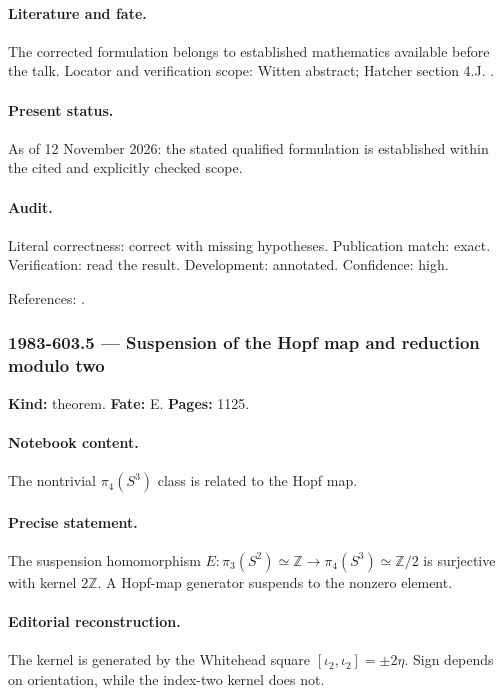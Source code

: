 \paragraph{Literature and fate.} The corrected formulation belongs to established mathematics available before the talk. Locator and verification scope: Witten abstract; Hatcher section 4.J. \cite{witten1982anomaly,hatcher2002algebraic}.

\paragraph{Present status.} As of 12 November 2026: the stated qualified formulation is established within the cited and explicitly checked scope.

\paragraph{Audit.} Literal correctness: correct with missing hypotheses. Publication match: exact. Verification: read the result. Development: annotated. Confidence: high.

\noindent References: \citep{witten1982anomaly,hatcher2002algebraic}.\par

\subsubsection{1983-603.5 --- Suspension of the Hopf map and reduction modulo two}

\label{item:1983-603.5}

\noindent\textbf{Kind:} theorem. \textbf{Fate:} E. \textbf{Pages:} 1125.\par

\paragraph{Notebook content.} The nontrivial \(\pi_4(S^3)\) class is related to the Hopf map.

\paragraph{Precise statement.} The suspension homomorphism \(E:\pi_3(S^2)\simeq\mathbb Z\to\pi_4(S^3)\simeq\mathbb Z/2\) is surjective with kernel \(2\mathbb Z\). A Hopf-map generator suspends to the nonzero element.

\paragraph{Editorial reconstruction.} The kernel is generated by the Whitehead square \([\iota_2,\iota_2]=\pm2\eta\). Sign depends on orientation, while the index-two kernel does not.

